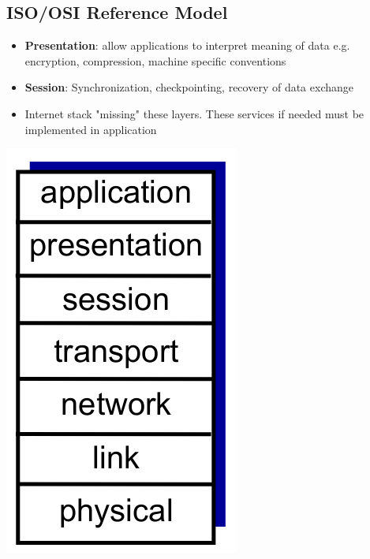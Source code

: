 \documentclass{article}[18pt]
\begin{document}
\subsection{ISO/OSI Reference Model}

\begin{minipage}{0.7\textwidth}
\begin{itemize}
	\item \textbf{Presentation}: allow applications to interpret meaning of data e.g. encryption, compression, machine specific conventions
	\item \textbf{Session}: Synchronization, checkpointing, recovery of data exchange
	\item Internet stack "missing" these layers. These services if needed must be implemented in application
\end{itemize}
\end{minipage}
\begin{minipage}{0.3\textwidth}
\includegraphics[scale=0.5]{OSI}

\end{minipage}
\end{document}
